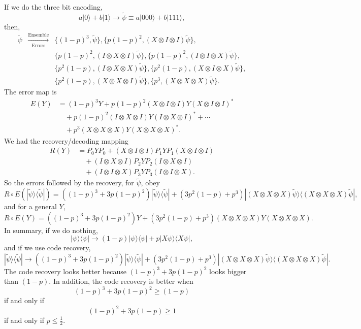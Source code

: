 \documentclass[12pt]{article}
\theoremstyle{definition}
\begin{document}
If we do the three bit encoding,
\[
a|0\rangle+b|1\rangle \to \widetilde{\psi} \equiv a|000\rangle+b|111\rangle,
\]
then,
\[
\begin{array}{rcl}
\widetilde{\psi} & \xrightarrow[\text{Errors}]{\text{Ensemble}} & \{(1-p)^3,\widetilde{\psi}\}, \{p(1-p)^2,(X\otimes I\otimes I)\widetilde{\psi}\}, \\
&& \{p(1-p)^2,(I\otimes X\otimes I)\widetilde{\psi}\}, \{p(1-p)^2,(I\otimes I\otimes X)\widetilde{\psi}\}, \\
&& \{p^2(1-p),(I\otimes X\otimes X)\widetilde{\psi}\}, \{p^2(1-p),(X\otimes I\otimes X)\widetilde{\psi}\}, \\
&& \{p^2(1-p),(X\otimes X\otimes I)\widetilde{\psi}\}, \{p^3,(X\otimes X\otimes X)\widetilde{\psi}\}.
\end{array}
\]
The error map is
\begin{align*}
E(Y) &= (1-p)^3Y + p(1-p)^2(X \otimes I \otimes I)Y(X \otimes I \otimes I)^* \\
&\quad + p(1-p)^2(I \otimes X \otimes I)Y(I \otimes X \otimes I)^* + \cdots \\
&\quad + p^3(X \otimes X \otimes X)Y(X \otimes X \otimes X)^*.
\end{align*}
We had the recovery/decoding mapping
\begin{align*}
R(Y) &= P_0YP_0 + (X \otimes I \otimes I)P_1YP_1(X \otimes I \otimes I) \\
&\quad + (I \otimes X \otimes I)P_2YP_2(I \otimes X \otimes I) \\
&\quad + (I \otimes I \otimes X)P_3YP_3(I \otimes I \otimes X).
\end{align*}
So the errors followed by the recovery, for $\widetilde{\psi}$, obey
\[
R \circ E(|\widetilde{\psi}\rangle\langle \widetilde{\psi}|)=((1-p)^3+3p(1-p)^2)|\widetilde{\psi}\rangle\langle \widetilde{\psi}| + (3p^2(1-p)+p^3)|(X \otimes X \otimes X)\widetilde{\psi}\rangle\langle (X \otimes X \otimes X)\widetilde{\psi}|,
\]
and for a general $Y$,
\[
R \circ E(Y)=((1-p)^3+3p(1-p)^2)Y + (3p^2(1-p)+p^3)(X \otimes X \otimes X)Y(X \otimes X \otimes X).
\]
In summary, if we do nothing,
\[
|\psi\rangle\langle \psi| \to (1-p)|\psi\rangle\langle \psi| + p|X\psi\rangle\langle X\psi|,
\]
and if we use code recovery,
\[
|\widetilde{\psi}\rangle\langle \widetilde{\psi}| \to ((1-p)^3+3p(1-p)^2)|\widetilde{\psi}\rangle\langle \widetilde{\psi}| + (3p^2(1-p)+p^3)|(X \otimes X \otimes X)\widetilde{\psi}\rangle\langle (X \otimes X \otimes X)\widetilde{\psi}|.
\]
The code recovery looks better because $(1-p)^3+3p(1-p)^2$ looks bigger than $(1-p)$. In addition, the code recovery is better when
\[
(1-p)^3+3p(1-p)^2 \geq (1-p)
\]
if and only if
\[
(1-p)^2+3p(1-p) \geq 1
\]
if and only if $p \leq \frac{1}{2}$.
\end{document}
